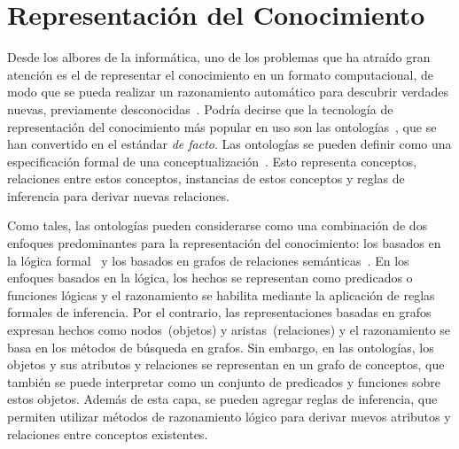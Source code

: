 \section{Representación del Conocimiento}\label{sec:sota-ontology}

Desde los albores de la informática, uno de los problemas que ha atraído gran atención es el de representar el conocimiento en un formato computacional, de modo que se pueda realizar un razonamiento automático para descubrir verdades nuevas, previamente desconocidas~\cite{sowa2000knowledge}. 
Podría decirse que la tecnología de representación del conocimiento más popular en uso son las ontologías~\cite{guarino1995formal}, que se han convertido en el estándar \emph{de facto}.
Las ontologías se pueden definir como una especificación formal de una conceptualización~\cite{asuncion2003}. Esto representa conceptos, relaciones entre estos conceptos, instancias de estos conceptos y reglas de inferencia para derivar nuevas relaciones.

Como tales, las ontologías pueden considerarse como una combinación de dos enfoques predominantes para la representación del conocimiento: los basados en la lógica formal~\cite{brachman1992knowledge} y los basados en grafos de relaciones semánticas~\cite{chein2008graph}. 
En los enfoques basados en la lógica, los hechos se representan como predicados o funciones lógicas y el razonamiento se habilita mediante la aplicación de reglas formales de inferencia.
Por el contrario, las representaciones basadas en grafos expresan hechos como nodos~(objetos) y aristas~(relaciones) y el razonamiento se basa en los métodos de búsqueda en grafos. 
Sin embargo, en las ontologías, los objetos y sus atributos y relaciones se representan en un grafo de conceptos, que también se puede interpretar como un conjunto de predicados y funciones sobre estos objetos. Además de esta capa, se pueden agregar reglas de inferencia, que permiten utilizar métodos de razonamiento lógico para derivar nuevos atributos y relaciones entre conceptos existentes.

